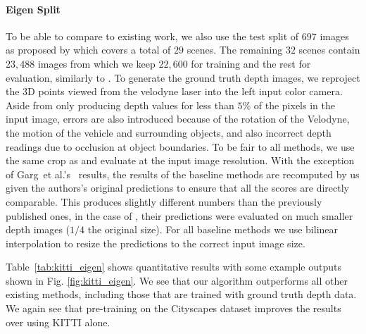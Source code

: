 \documentclass[10pt,twocolumn,letterpaper]{article}
\makeatletter
\newcommand*{\ea}{et al.\@\xspace}
\makeatother
\begin{document}
\paragraph{Eigen Split}
To be able to compare to existing work, we also use the test split of $697$ images as proposed by \cite{eigen2014depth} which covers a total of $29$ scenes. The remaining $32$ scenes contain $23,488$ images from which we keep $22,600$ for training and the rest for evaluation, similarly to \cite{garg2016unsupervised}.
To generate the ground truth depth images, we reproject the 3D points viewed from the velodyne laser into the left input color camera. 
Aside from only producing depth values for less than $5\%$ of the pixels in the input image, errors are also introduced because of the rotation of the Velodyne, the motion of the vehicle and surrounding objects, and also incorrect depth readings due to occlusion at object boundaries. 
To be fair to all methods, we use the same crop as \cite{eigen2014depth} and evaluate at the input image resolution. 
With the exception of Garg~\ea's~\cite{garg2016unsupervised} results, the results of the baseline methods are recomputed by us given the authors's original predictions to ensure that all the scores are directly comparable. 
This produces slightly different numbers than the previously published ones, \eg in the case of \cite{eigen2014depth}, their predictions were evaluated on much smaller depth images ($1/4$ the original size).
For all baseline methods we use bilinear interpolation to resize the predictions to the correct input image size. 

Table~\ref{tab:kitti_eigen} shows quantitative results with some example outputs shown in Fig. \ref{fig:kitti_eigen}.
We see that our algorithm outperforms all other existing methods, including those that are trained with ground truth depth data. 
We again see that pre-training on the Cityscapes dataset improves the results over using KITTI alone.
\end{document}
